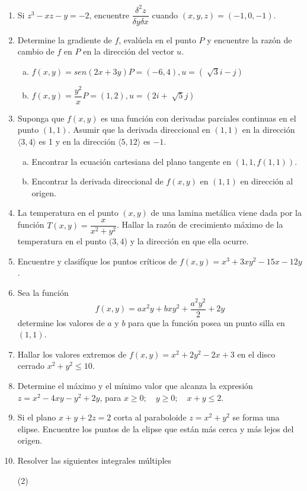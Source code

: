 \documentclass[12pt]{article}
\newenvironment{preguntas}
{\begin{enumerate}\itemsep12pt
	}
	{
	\end{enumerate}
}
\begin{document}
\begin{preguntas}
\item Si $z^3 - xz - y = -2$, encuentre $\dfrac{\delta^2z}{\delta y \delta x}$ cuando $(x,y,z) = (-1, 0, -1)$.
\item Determine la gradiente de $f$, evalúela en el punto $P$ y encuentre la razón de cambio de $f$ en $P$ en la dirección del vector $u$.
\begin{enumerate}[a)]
\item $f(x,y) = sen(2x+3y)$\tab$P=(-6,4), u=\left(\sqrt[]{3}i - j\right)$
\item $f(x,y) = \dfrac{y^2}{x}$\tab$P=(1,2), u=\left(2i + \sqrt[]{5}j\right)$
\end{enumerate}
\item Suponga que $f(x,y)$ es una función con derivadas parciales continuas en el punto $(1,1)$. Asumir que la derivada direccional en $(1,1)$ en la dirección $\langle3,4\rangle$ 			es 1 y en la dirección $\langle5,12\rangle$ es $-1$.
\begin{enumerate}[a)]
\item Encontrar la ecuación cartesiana del plano tangente en $(1,1,f(1,1))$.
\item Encontrar la derivada direccional de $f(x,y)$ en $(1,1)$ en dirección al origen.	
\end{enumerate}
\item La temperatura en el punto $(x,y)$ de una lamina metálica viene dada por la función $T(x,y) = \dfrac{x}{x^2+y^2}$. Hallar la razón de crecimiento máximo de la temperatura en el punto $(3,4$) y la dirección en que ella ocurre.
\item Encuentre y clasifíque los puntos críticos de $f(x,y)=x^3+3xy^2-15x-12y$.
\item Sea la función
	$$f(x,y)=ax^2y+bxy^2+\dfrac{a^2y^2}{2}+2y$$
	determine los valores de $a$ y $b$ para que la función posea un punto silla en $(1,1)$.
\item Hallar los valores extremos de $f(x,y) = x^2+2y^2-2x+3$ en el disco cerrado $x^2+y^2 \leq 10$.
\item Determine el máximo y el mínimo valor que alcanza la expresión $z=x^2-4xy-y^2+2y$, para $x\geq0;\quad y\geq0;\quad x+y\leq2$.
\item Si el plano $x+y+2z=2$ corta al paraboloide $z=x^2+y^2$ se forma una elipse. Encuentre los puntos de la elipse que están más cerca y más lejos del origen.
\item Resolver las siguientes integrales múltiples
\begin{tasks}(2)

\end{tasks}
\end{preguntas}
\end{document}
